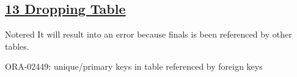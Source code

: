 \subsection*{\underline{13 Dropping Table}}

\vspace{0.15cm}

\begin{prettyBox}{Note}{red}
It will result into an error because finals is been referenced by other tables.
\begin{center}
    ORA-02449: unique/primary keys in table referenced by foreign keys
\end{center}   
\end{prettyBox}




